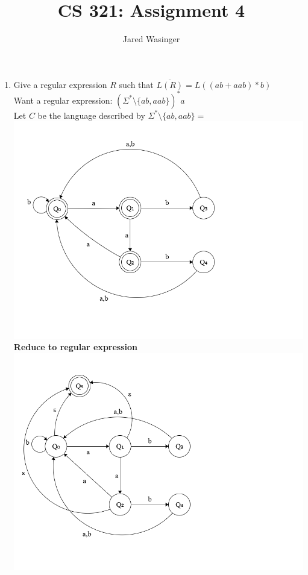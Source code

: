 \documentclass{article}
\begin{document}
  \title{CS 321: Assignment 4}
  \author{Jared Wasinger}

  \maketitle

  \begin{enumerate}
		\item Give a regular expression $R$ such that $\overline{L(R)} = L((ab + aab)*b)$\\
			Want a regular expression: $(\Sigma^* \setminus \{ab, aab\})^*a$\\
			Let $C$ be the language described by $\Sigma^* \setminus \{ab, aab\} = $\\
			\includegraphics[width=\textwidth]{p1_C.png}\\
			\textbf{Reduce to regular expression}\\
			\includegraphics[width=\textwidth]{p1_C_reduced_1.png}\\

\end{enumerate}
\end{document}
